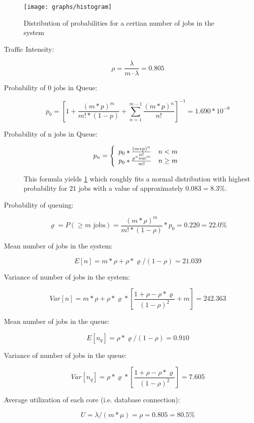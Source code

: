\documentclass[a4paper, oneside]{csthesis}
\begin{document}
    \begin{figure}[th]
        \centering
            \texttt{[image: graphs/histogram]}
            \caption{Distribution of probabilities for a certian number of jobs
            in the system}
            \label{fig:jobs-in-queue-db}
    \end{figure}
    


\begin{description}
\item[Traffic Intensity:]
    \[
        \rho = \frac{\lambda}{m \cdot \lambda} = 0.805
    \]

\item[Probability of 0 jobs in Queue:]
\[
p_0 = \left[1 + \frac{(m*p)^m}{m! * (1-p)} + \sum_{n=1}^{m-1}
\frac{(m*p)^n}{n!}\right]^{-1} = 1.690 * 10^{-9}
\]

\item[Probability of n jobs in Queue:]
\[
p_n = \left\{
    \begin{array}{l l}
    p_0 * \frac{(m*p)^n}{n!} & n < m\\
    p_0 * \frac{p^n*m^m}{m!} & n \geq m
    \end{array} 
    \right.
\]

This formula yields \cref{fig:jobs-in-queue-db} which roughly fits a normal
distribution with highest probability for $21$ jobs with a value of
approximately $0.083 = 8.3 \%$.

\item[Probability of queuing:]
\[
\varrho = P(\geq m \text{ jobs}) = \frac{(m*\rho)^m}{m! * (1 - \rho)}*p_0 =
0.220 = 22.0 \%
\]

\item[Mean number of jobs in the system:]
\[
E[n] = m * \rho + \rho * \varrho /(1 - \rho) = 21.039
\]

\item[Variance of number of jobs in the system:]
\[
Var[n] = m * \rho + \rho * \varrho * \left[\frac{1 + \rho - \rho *
\varrho}{(1 - \rho)^2} + m\right] = 242.363
\]

\item[Mean number of jobs in the queue:]
\[
E[n_q] = \rho * \varrho / (1-\rho) = 0.910
\]

\item[Variance of number of jobs in the queue:]
\[
Var[n_q] = \rho * \varrho * \left[\frac{1 + \rho - \rho *
\varrho}{(1-\rho)^2}\right] = 7.605
\]

\item[Average utilization of each core (i.e. database connection):]
\[
U = \lambda/(m*\mu) = \rho = 0.805 = 80.5 \%
\]


\end{description}
\end{document}

